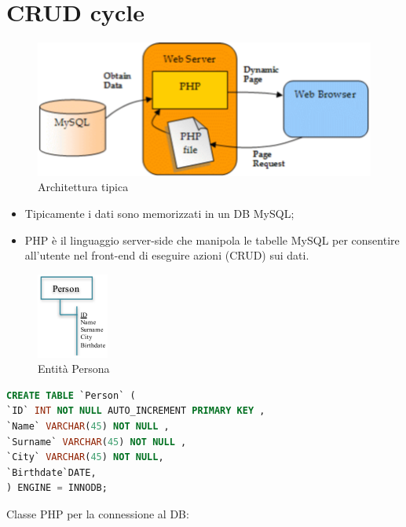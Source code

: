 \section{CRUD cycle}

\begin{center}
\begin{figure}[H]
\centering
\includegraphics[scale=1]{figures/architecture.png}
\caption{Architettura tipica} 
\end{figure}
\end{center}

\begin{itemize}

\item Tipicamente i dati sono memorizzati in un DB MySQL;
\item PHP è il linguaggio server-side che manipola le tabelle MySQL per consentire all’utente nel front-end di eseguire azioni (CRUD) sui dati.

\end{itemize}

\begin{center}
\begin{figure}[H]
\centering
\includegraphics[scale=1]{figures/person_entity2.png}
\caption{Entità Persona} 
\end{figure}
\end{center}

\begin{lstlisting}[language=SQL]
CREATE TABLE `Person` (
`ID` INT NOT NULL AUTO_INCREMENT PRIMARY KEY ,
`Name` VARCHAR(45) NOT NULL ,
`Surname` VARCHAR(45) NOT NULL ,
`City` VARCHAR(45) NOT NULL,
`Birthdate`DATE,
) ENGINE = INNODB;
\end{lstlisting}

Classe PHP per la connessione al DB:

